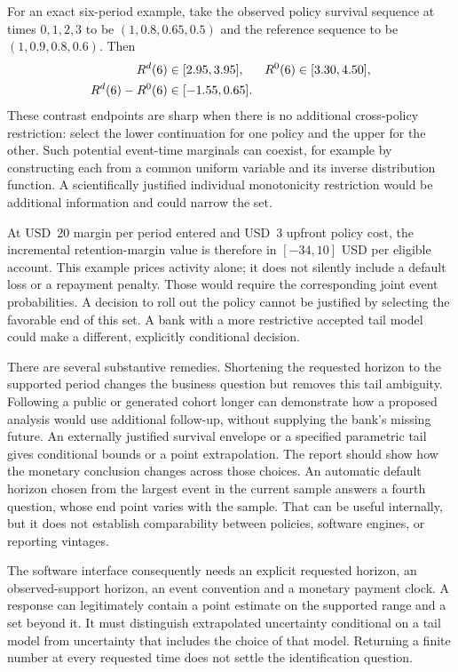 For an exact six-period example, take the observed policy survival sequence
at times $0,1,2,3$ to be $(1,0.8,0.65,0.5)$ and the reference sequence to be
$(1,0.9,0.8,0.6)$. Then
\begin{align}
 R^d(6)&\in[2.95,3.95],& R^0(6)&\in[3.30,4.50],\notag\\
 R^d(6)-R^0(6)&\in[-1.55,0.65].
 \label{exec17:s5-tail-example}
\end{align}
These contrast endpoints are sharp when there is no additional cross-policy
restriction: select the lower continuation for one policy and the upper for
the other. Such potential event-time marginals can coexist, for example by
constructing each from a common uniform variable and its inverse distribution
function. A scientifically justified individual monotonicity restriction
would be additional information and could narrow the set.

At USD~20 margin per period entered and USD~3 upfront policy cost, the
incremental retention-margin value is therefore in $[-34,10]$ USD per eligible
account. This example prices activity alone; it does not silently include a
default loss or a repayment penalty. Those would require the corresponding
joint event probabilities. A decision to roll out the policy cannot be
justified by selecting the favorable end of this set. A bank with a more
restrictive accepted tail model could make a different, explicitly conditional
decision.~\citep{exec17_s5_math}

There are several substantive remedies. Shortening the requested horizon to
the supported period changes the business question but removes this tail
ambiguity. Following a public or generated cohort longer can demonstrate how
a proposed analysis would use additional follow-up, without supplying the
bank's missing future. An externally justified survival envelope or a specified
parametric tail gives conditional bounds or a point extrapolation. The
report should show how the monetary conclusion changes across those choices.
An automatic default horizon chosen from the largest event in the current
sample answers a fourth question, whose end point varies with the sample.
That can be useful internally, but it does not establish comparability between
policies, software engines, or reporting vintages.

The software interface consequently needs an explicit requested horizon,
an observed-support horizon, an event convention and a monetary payment clock.
A response can legitimately contain a point estimate on the supported range
and a set beyond it. It must distinguish extrapolated uncertainty conditional
on a tail model from uncertainty that includes the choice of that model.
Returning a finite number at every requested time does not settle the
identification question.

